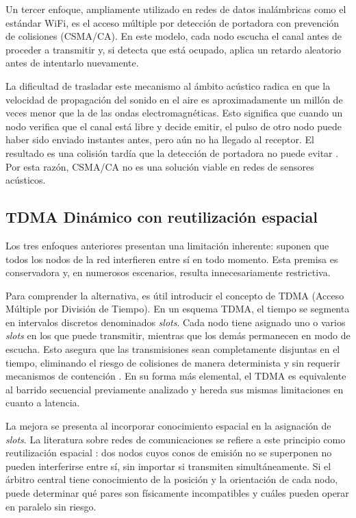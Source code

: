 Un tercer enfoque, ampliamente utilizado en redes de datos inalámbricas como el estándar WiFi, es el acceso múltiple por detección de portadora con prevención de colisiones (CSMA/CA). En este modelo, cada nodo escucha el canal antes de proceder a transmitir y, si detecta que está ocupado, aplica un retardo aleatorio antes de intentarlo nuevamente.

La dificultad de trasladar este mecanismo al ámbito acústico radica en que la velocidad de propagación del sonido en el aire es aproximadamente un millón de veces menor que la de las ondas electromagnéticas. Esto significa que cuando un nodo verifica que el canal está libre y decide emitir, el pulso de otro nodo puede haber sido enviado instantes antes, pero aún no ha llegado al receptor. El resultado es una colisión tardía que la detección de portadora no puede evitar \cite{9}. Por esta razón, CSMA/CA no es una solución viable en redes de sensores acústicos.

\subsection{TDMA Dinámico con reutilización espacial}

Los tres enfoques anteriores presentan una limitación inherente: suponen que todos los nodos de la red interfieren entre sí en todo momento. Esta premisa es conservadora y, en numerosos escenarios, resulta innecesariamente restrictiva.

Para comprender la alternativa, es útil introducir el concepto de TDMA (Acceso Múltiple por División de Tiempo). En un esquema TDMA, el tiempo se segmenta en intervalos discretos denominados \textit{slots}. Cada nodo tiene asignado uno o varios \textit{slots} en los que puede transmitir, mientras que los demás permanecen en modo de escucha. Esto asegura que las transmisiones sean completamente disjuntas en el tiempo, eliminando el riesgo de colisiones de manera determinista y sin requerir mecanismos de contención \cite{17}. En su forma más elemental, el TDMA es equivalente al barrido secuencial previamente analizado y hereda sus mismas limitaciones en cuanto a latencia.

La mejora se presenta al incorporar conocimiento espacial en la asignación de \textit{slots}. La literatura sobre redes de comunicaciones se refiere a este principio como reutilización espacial \cite{16}: dos nodos cuyos conos de emisión no se superponen no pueden interferirse entre sí, sin importar si transmiten simultáneamente. Si el árbitro central tiene conocimiento de la posición y la orientación de cada nodo, puede determinar qué pares son físicamente incompatibles y cuáles pueden operar en paralelo sin riesgo.

